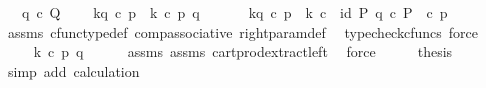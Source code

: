 \begin{isabellebody}
\ \ \ {\isachardoublequoteopen}q\ {\isasymin}\isactrlsub c\ Q{\isachardoublequoteclose}\isanewline
\ \ \ \ {\isachardoublequoteopen}k\isactrlbsub {\isacharbrackleft}{\kern0pt}{\isacharminus}{\kern0pt}{\isacharcomma}{\kern0pt}q{\isacharbrackright}{\kern0pt}\isactrlesub \ {\isasymcirc}\isactrlsub c\ p\ {\isacharequal}{\kern0pt}\ k\ {\isasymcirc}\isactrlsub c\ {\isasymlangle}p{\isacharcomma}{\kern0pt}\ q{\isasymrangle}{\isachardoublequoteclose}\isanewline
%
\isadelimproof
%
\endisadelimproof
%
\isatagproof
{}\isamarkupfalse%
\ {\isacharminus}{\kern0pt}\ \isanewline
\ \ \isamarkupfalse%
\ {\isachardoublequoteopen}k\isactrlbsub {\isacharbrackleft}{\kern0pt}{\isacharminus}{\kern0pt}{\isacharcomma}{\kern0pt}q{\isacharbrackright}{\kern0pt}\isactrlesub \ {\isasymcirc}\isactrlsub c\ p\ {\isacharequal}{\kern0pt}\ k\ {\isasymcirc}\isactrlsub c\ \ {\isasymlangle}id\ P{\isacharcomma}{\kern0pt}\ q\ {\isasymcirc}\isactrlsub c\ {\isasymbeta}\isactrlbsub P\isactrlesub {\isasymrangle}\ \ {\isasymcirc}\isactrlsub c\ p{\isachardoublequoteclose}\isanewline
\ \ \ \ \isamarkupfalse%
\ assms\ cfunc{\isacharunderscore}{\kern0pt}type{\isacharunderscore}{\kern0pt}def\ comp{\isacharunderscore}{\kern0pt}associative\ right{\isacharunderscore}{\kern0pt}param{\isacharunderscore}{\kern0pt}def{}\ \isamarkupfalse%
\ {\isacharparenleft}{\kern0pt}typecheck{\isacharunderscore}{\kern0pt}cfuncs{\isacharcomma}{\kern0pt}\ force{\isacharparenright}{\kern0pt}\isanewline
\ \ \isamarkupfalse%
\ \isamarkupfalse%
\ {\isachardoublequoteopen}{\isachardot}{\kern0pt}{\isachardot}{\kern0pt}{\isachardot}{\kern0pt}\ {\isacharequal}{\kern0pt}\ k\ {\isasymcirc}\isactrlsub c\ {\isasymlangle}p{\isacharcomma}{\kern0pt}\ q{\isasymrangle}{\isachardoublequoteclose}\isanewline
\ \ \ \ \isamarkupfalse%
\ assms{\isacharparenleft}{\kern0pt}{}{\isacharparenright}{\kern0pt}\ assms{\isacharparenleft}{\kern0pt}{}{\isacharparenright}{\kern0pt}\ cart{\isacharunderscore}{\kern0pt}prod{\isacharunderscore}{\kern0pt}extract{\isacharunderscore}{\kern0pt}left\ \isamarkupfalse%
\ force\isanewline
\ \ \isamarkupfalse%
\ \isamarkupfalse%
\ {\isacharquery}{\kern0pt}thesis\isanewline
\ \ \ \ \isamarkupfalse%
\ {\isacharparenleft}{\kern0pt}simp\ add{\isacharcolon}{\kern0pt}\ calculation{\isacharparenright}{\kern0pt}\isanewline
{}\isamarkupfalse%
%
\endisatagproof
{\isafoldproof}%

\end{isabellebody}
